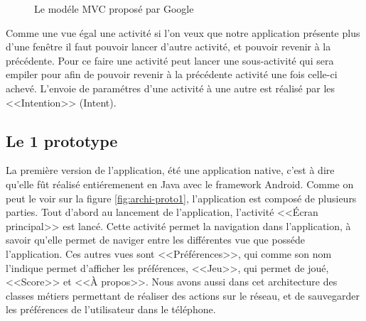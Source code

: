 \documentclass[a4paper,11pt,french]{article}
\def\android{Android\texttrademark{}}
\begin{document}
\begin{figure}[h!]
  \begin{center}
    \caption{Le modéle MVC proposé par Google}
    \label{fig:MVC}
  \end{center}
\end{figure}

Comme une vue égal une activité si l'on veux que notre application présente plus d'une fenêtre il faut pouvoir lancer d'autre activité, et pouvoir revenir à la précédente. Pour ce faire une activité peut lancer une sous-activité qui sera empiler pour afin de pouvoir revenir à la précédente activité une fois celle-ci achevé. L'envoie de paramétres d'une activité à une autre est réalisé par les <<Intention>> (Intent).



\subsection{Le 1 prototype}

La première version de l'application, été une application native, c'est à dire qu'elle fût réalisé entiéremenent en Java avec le framework \android{}. Comme on peut le voir sur la figure \ref{fig:archi-proto1}, l'application est composé de plusieurs parties. Tout d'abord au lancement de l'application, l'activité <<Écran principal>> est lancé. Cette activité permet la navigation dans l'application, à savoir qu'elle permet de naviger entre les différentes vue que posséde l'application. Ces autres vues sont <<Préférences>>, qui comme son nom l'indique permet d'afficher les préférences, <<Jeu>>, qui permet de joué, <<Score>> et <<À propos>>.
Nous avons aussi dans cet architecture des classes métiers permettant de réaliser des actions sur le réseau, et de sauvegarder les préférences de l'utilisateur dans le téléphone.
\end{document}
